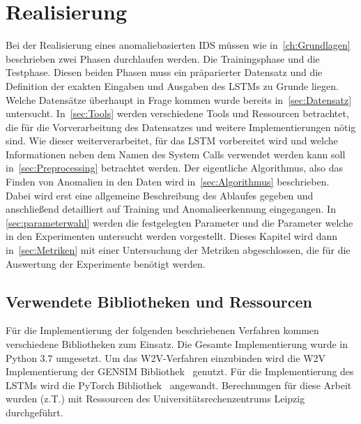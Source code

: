 \chapter{Realisierung}\label{ch:Realisierung}
    Bei der Realisierung eines anomaliebasierten \ac{IDS} müssen wie in~\autoref{ch:Grundlagen} beschrieben zwei Phasen durchlaufen werden.
    Die Trainingsphase und die Testphase.
    Diesen beiden Phasen muss ein präparierter Datensatz und die Definition der exakten Eingaben und Ausgaben des \acp{LSTM} zu Grunde liegen. 
    Welche Datensätze überhaupt in Frage kommen wurde bereits in~\autoref{sec:Datensatz} untersucht.
    In~\autoref{sec:Tools} werden verschiedene Tools und Ressourcen betrachtet, die für die Vorverarbeitung des Datensatzes und weitere Implementierungen nötig sind.
    Wie dieser weiterverarbeitet, für das \ac{LSTM} vorbereitet wird und welche Informationen neben dem Namen des System Calls verwendet werden kann soll in~\autoref{sec:Preprocessing} betrachtet werden.
    Der eigentliche Algorithmus, also das Finden von Anomalien in den Daten wird in~\autoref{sec:Algorithmus} beschrieben.
    Dabei wird erst eine allgemeine Beschreibung des Ablaufes gegeben und anschließend detailliert auf Training und Anomalieerkennung eingegangen.
    In \autoref{sec:parameterwahl} werden die festgelegten Parameter und die Parameter welche in den Experimenten untersucht werden vorgestellt.
    Dieses Kapitel wird dann in~\autoref{sec:Metriken} mit einer Untersuchung der Metriken abgeschlossen, die für die Auswertung der Experimente benötigt werden. 

    \section{Verwendete Bibliotheken und Ressourcen}\label{sec:Tools}
        Für die Implementierung der folgenden beschriebenen Verfahren kommen verschiedene Bibliotheken zum Einsatz.
        Die Gesamte Implementierung wurde in Python $3.7$ umgesetzt.
        Um das \ac{W2V}-Verfahren einzubinden wird die \ac{W2V} Implementierung der GENSIM Bibliothek~\cite{GENSIM} genutzt.
        Für die Implementierung des \acp{LSTM} wird die PyTorch Bibliothek~\cite{PYTORCH} angewandt. 
        Berechnungen für diese Arbeit wurden (z.T.) mit Ressourcen des Universitätsrechenzentrums Leipzig durchgeführt.

